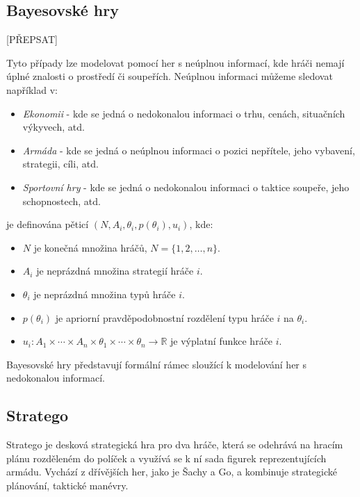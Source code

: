 \subsection{Bayesovské hry}
{\color {red} [PŘEPSAT]}\label{subsec:bayesovske-hry}


Tyto případy lze modelovat pomocí her s neúplnou informací, kde hráči nemají úplné znalosti o prostředí či soupeřích.
Neúplnou informaci můžeme sledovat například v:
\begin{itemize}
  \item \emph{Ekonomii} - kde se jedná o nedokonalou informaci o trhu, cenách, situačních výkyvech, atd.
  \item \emph{Armáda} - kde se jedná o neúplnou informaci o pozici nepřítele, jeho vybavení, strategii, cíli, atd.
  \item \emph{Sportovní hry} - kde se jedná o nedokonalou informaci o taktice soupeře, jeho schopnostech, atd.
\end{itemize}

\begin{definition}
\cite{Y_Narahari} je definována pěticí $(N, A_i, \theta_i, p(\theta_i), u_i)$, kde:

\begin{itemize}
\item $N$ je konečná množina hráčů, $N = \{1, 2, \ldots, n\}$.
\item $A_i$ je neprázdná množina strategií hráče $i$.
\item $\theta_i$ je neprázdná množina typů hráče $i$.
\item $p(\theta_i)$ je apriorní pravděpodobnostní rozdělení typu hráče $i$ na $\theta_i$.
\item $u_i: A_1 \times \cdots \times A_n \times \theta_1 \times \cdots \times \theta_n \rightarrow \mathbb{R}$ je výplatní funkce hráče $i$.
\end{itemize}
\end{definition}
Bayesovské hry představují formální rámec sloužící k modelování her s nedokonalou informací.

\subsection{Stratego}\label{subsec:stratego}

Stratego je desková strategická hra pro dva hráče, která se odehrává na hracím plánu rozděleném do políček a využívá se k ní sada figurek reprezentujících armádu.
Vychází z dřívějších her, jako je Šachy a Go, a kombinuje strategické plánování, taktické manévry.

